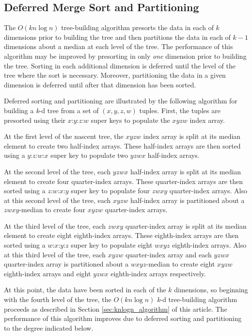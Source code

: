 \documentclass{sig-alternate}
\begin{document}
\subsection{Deferred Merge Sort and Partitioning}

The $O\left(kn \log n\right)$ tree-building algorithm presorts the data in each of $k$ dimensions prior to building the tree and then partitions the data in each of $k-1$ dimensions about a median at each level of the tree. The performance of this algorithm may be improved by presorting in only \emph{one} dimension prior to building the tree.  Sorting in each additional dimension is deferred until the level of the tree where the sort is necessary. Moreover, partitioning the data in a given dimension is deferred until after that dimension has been sorted.

Deferred sorting and partitioning are illustrated by the following algorithm for building a \emph{k}-d tree from a set of $\left(x,y,z,w\right)$ tuples.  First, the tuples are presorted using their $x$:$y$:$z$:$w$ super keys to populate the $xyzw$ index array.

At the first level of the nascent tree, the $xyzw$ index array is split at its median element to create two half-index arrays. These half-index arrays are then sorted using a $y$:$z$:$w$:$x$ super key to populate two $yzwx$ half-index arrays.

At the second level of the tree, each $yzwx$ half-index array is split at its median element to create four quarter-index arrays. These quarter-index arrays are then sorted using a $z$:$w$:$x$:$y$ super key to populate four $zwxy$ quarter-index arrays.  Also at this second level of the tree, each $xyzw$ half-index array is partitioned about a $zwxy$-median to create four $xyzw$ quarter-index arrays.

At the third level of the tree, each $zwxy$ quarter-index array is split at its median element to create eight eighth-index arrays. These eighth-index arrays are then sorted using a $w$:$x$:$y$:$z$ super key to populate eight $wxyz$ eighth-index arrays.  Also at this third level of the tree, each $xyzw$ quarter-index array and each $yzwx$ quarter-index array is partitioned about a $wxyz$-median to create eight $xyzw$ eighth-index arrays and eight $yzwx$ eighth-index arrays respectively.

At this point, the data have been sorted in each of the $k$ dimensions, so beginning with the fourth level of the tree, the $O\left(kn \log n\right)$ \emph{k}-d tree-building algorithm proceeds as described in Section \ref{sec:knlogn_algorithm} of this article. The performance of this algorithm improves due to deferred sorting and partitioning to the degree indicated below.
\end{document}
